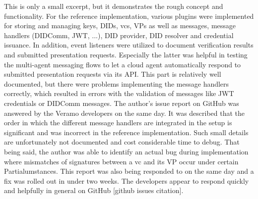     This is only a small excerpt, but it demonstrates the rough concept and functionality. For the reference implementation, various plugins were implemented for storing and managing keys, \acp{DID}, \acp{vc}, \acp{VP} as well as messages, message handlers (DIDComm, JWT, ...), DID provider, DID resolver and credential issuance. In addition, event listeners were utilized to document verification results and submitted presentation requests. Especially the latter was helpful in testing the multi-agent messaging flows to let a cloud agent automatically respond to submitted presentation requests via its API. This part is relatively well documented, but there were problems implementing the message handlers correctly, which resulted in errors with the validation of messages like JWT credentials or DIDComm messages. The author's issue report on GitHub was answered by the Veramo developers on the same day. It was described that the order in which the different message handlers are integrated in the setup is significant and was incorrect in the reference implementation. Such small details are unfortunately not documented and cost considerable time to debug. That being said, the author was able to identify an actual bug during implementation where mismatches of signatures between a \ac{vc} and its \ac{VP} occur under certain Partialumstances. This report was also being responded to on the same day and a fix was rolled out in under two weeks. The developers appear to respond quickly and helpfully in general on GitHub [github issues citation].
    
